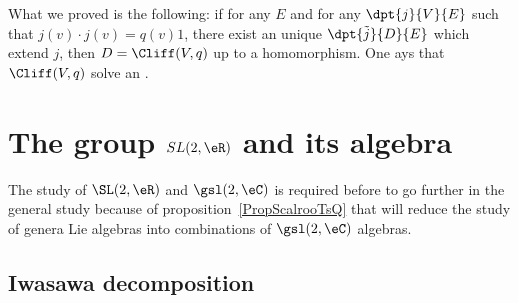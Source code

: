 What we proved is the following: if for any $E$ and for any $\dpt{j}{V}{E}$ such that $j(v)\cdot j(v)=q(v)1$, there exist an unique $\dpt{\tilde{j}}{D}{E}$ which extend $j$, then $D=\Cliff(V,q)$ up to a homomorphism. One ays that $\Cliff(V,q)$ solve an .

\section{The group \texorpdfstring{$SL(2,\eR)$}{SL2R} and its algebra}  \label{SecToolSL}

The study of \( \SL(2,\eR)\) and \( \gsl(2,\eC)\) is required before to go further in the general study because of proposition~\ref{PropScalrooTsQ} that will reduce the study of genera Lie algebras into combinations of \( \gsl(2,\eC)\) algebras.

\subsection{Iwasawa decomposition}

